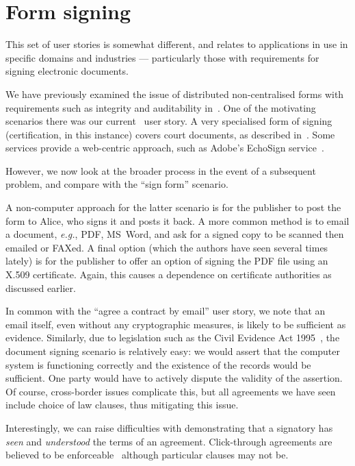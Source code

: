 \documentclass{article}
\def\citeN{\citet}
\def\cite{\citep}
\newcommand{\eg}{\textit{e.g.}}
\newenvironment{userstories}{\begin{description}}{\end{description}}
\begin{document}
\section{Form signing}\label{sec:formSigning}
This set of user stories is somewhat different, and relates to applications
in use in specific domains and industries --- particularly those with 
requirements for signing electronic documents.

\begin{userstories}
\USAfinternal
\USAfsign
\end{userstories}

We have previously examined the issue of distributed non-centralised
forms with requirements such as integrity and auditability
in~\citeN{Brooke+09b}.  One of the motivating scenarios there was our
current \USTfinternal\ user story.  A very specialised form of
signing (certification, in this instance) covers court documents, as
described in~\cite{Reiniger+10}.
Some services provide a web-centric approach, such as Adobe's EchoSign service~\cite{EchoSign}.

However, we now look at the broader process in the event of a
subsequent problem, and compare with the ``sign form'' scenario.

A non-computer approach for the latter scenario is for the publisher
to post the form to Alice, who signs it and posts it back.  A more
common method is to email a document, \eg, PDF, MS~Word, and ask for a
signed copy to be scanned then emailed or FAXed.  A final option (which
the authors have seen several times lately) is for the publisher to
offer an option of signing the PDF file using an X.509 certificate.
Again, this causes a dependence on certificate authorities as discussed earlier.

In common with the ``agree a contract by email'' user story, we note that an email
itself, even without any cryptographic measures, is likely to be
sufficient as evidence.  Similarly, due to legislation such as the Civil
Evidence Act 1995~\cite{CEA1995},  the document signing scenario is
relatively easy: we would assert that the computer system is functioning
correctly and the existence of the records would be sufficient.  One
party would have to actively dispute the validity of the assertion.
Of course, cross-border issues complicate this, but all agreements we
have seen include choice of law clauses, thus mitigating this issue.

Interestingly, we can raise difficulties with demonstrating that a
signatory has \emph{seen} and \emph{understood} the terms of an
agreement.  Click-through agreements are believed to be
enforceable~\cite{mMason1} although particular clauses may not be.
\end{document}
